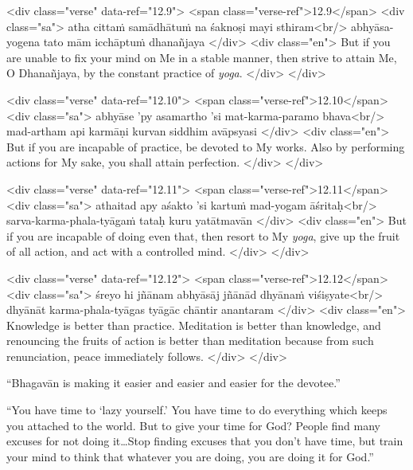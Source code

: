 \begin{html}
<div class="verse" data-ref="12.9">
  <span class="verse-ref">12.9</span>
  <div class="sa">
    atha cittaṁ samādhātuṁ na śaknoṣi mayi sthiram<br/>
    abhyāsa-yogena tato mām icchāptuṁ dhanañjaya
  </div>
  <div class="en">
    But if you are unable to fix your mind on Me in a stable manner, then strive to attain Me, O Dhanañjaya, by the constant practice of \textit{yoga}.
  </div>
</div>
\end{html}



\begin{html}
<div class="verse" data-ref="12.10">
  <span class="verse-ref">12.10</span>
  <div class="sa">
    abhyāse ’py asamartho ’si mat-karma-paramo bhava<br/>
    mad-artham api karmāṇi kurvan siddhim avāpsyasi
  </div>
  <div class="en">
    But if you are incapable of practice, be devoted to My works. Also by performing actions for My sake, you shall attain perfection.
  </div>
</div>
\end{html}



\begin{html}
<div class="verse" data-ref="12.11">
  <span class="verse-ref">12.11</span>
  <div class="sa">
    athaitad apy aśakto ’si kartuṁ mad-yogam āśritaḥ<br/>
    sarva-karma-phala-tyāgaṁ tataḥ kuru yatātmavān
  </div>
  <div class="en">
    But if you are incapable of doing even that, then resort to My \textit{yoga}, give up the fruit of all action, and act with a controlled mind.
  </div>
</div>
\end{html}



\begin{html}
<div class="verse" data-ref="12.12">
  <span class="verse-ref">12.12</span>
  <div class="sa">
    śreyo hi jñānam abhyāsāj jñānād dhyānaṁ viśiṣyate<br/>
    dhyānāt karma-phala-tyāgas tyāgāc chāntir anantaram
  </div>
  <div class="en">
    Knowledge is better than practice. Meditation is better than knowledge, and renouncing the fruits of action is better than meditation because from such renunciation, peace immediately follows.
  </div>
</div>
\end{html}


\enquote{Bhagavān is making it easier and easier and easier for the devotee.}

\enquote{You have time to \enquote{lazy yourself.} You have time to do everything which keeps you attached to the world. But to give your time for God? People find many excuses for not doing it\ldots Stop finding excuses that you don’t have time, but train your mind to think that whatever you are doing, you are doing it for God.}

